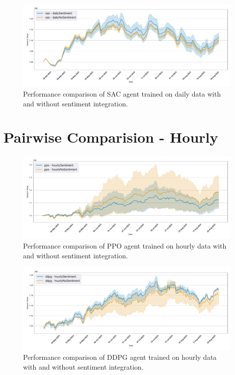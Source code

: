 \documentclass[12pt]{article}
\begin{document}
\begin{figure}[h]
\centering
\includegraphics[width=1\textwidth]{figs/Models_comparison/Sentiment/Compare_agent_performance_dailySentiment_sac.pdf}
\caption{Performance comparison of SAC agent trained on daily data with and without sentiment integration.}
\label{fig:Compare_agent_performance_dailySentiment_sac}
\end{figure}


\section{Pairwise Comparision - Hourly}

\begin{figure}[h]
\centering
\includegraphics[width=1\textwidth]{figs/Models_comparison/Sentiment/Compare_agent_performance_hourlySentiment_ppo.pdf}
\caption{Performance comparison of PPO agent trained on hourly data with and without sentiment integration.}
\label{fig:Compare_agent_performance_hourlySentiment_ppo}
\end{figure}

\begin{figure}[h]
\centering
\includegraphics[width=1\textwidth]{figs/Models_comparison/Sentiment/Compare_agent_performance_hourlySentiment_ddpg.pdf}
\caption{Performance comparison of DDPG agent trained on hourly data with and without sentiment integration.}
\label{fig:Compare_agent_performance_hourlySentiment_ddpg}
\end{figure}
\end{document}

